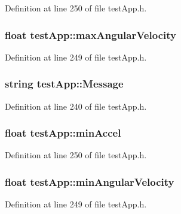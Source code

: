 Definition at line 250 of file test\-App.\-h.

\hypertarget{classtest_app_ab9565e8e6dc748ef68e6845f5f94cae9}{
\subsubsection[{max\-Angular\-Velocity}]{\setlength{\rightskip}{0pt plus 5cm}float test\-App\-::max\-Angular\-Velocity}}\label{classtest_app_ab9565e8e6dc748ef68e6845f5f94cae9}


Definition at line 249 of file test\-App.\-h.

\hypertarget{classtest_app_a0124035d0454fb6bd9152f8a87c40677}{
\subsubsection[{Message}]{\setlength{\rightskip}{0pt plus 5cm}string test\-App\-::\-Message}}\label{classtest_app_a0124035d0454fb6bd9152f8a87c40677}


Definition at line 240 of file test\-App.\-h.

\hypertarget{classtest_app_ab007edbc20b09d607f8010e2dbafdb97}{
\subsubsection[{min\-Accel}]{\setlength{\rightskip}{0pt plus 5cm}float test\-App\-::min\-Accel}}\label{classtest_app_ab007edbc20b09d607f8010e2dbafdb97}


Definition at line 250 of file test\-App.\-h.

\hypertarget{classtest_app_ac559756a01e0b98378bc29dfba9fac79}{
\subsubsection[{min\-Angular\-Velocity}]{\setlength{\rightskip}{0pt plus 5cm}float test\-App\-::min\-Angular\-Velocity}}\label{classtest_app_ac559756a01e0b98378bc29dfba9fac79}


Definition at line 249 of file test\-App.\-h.


